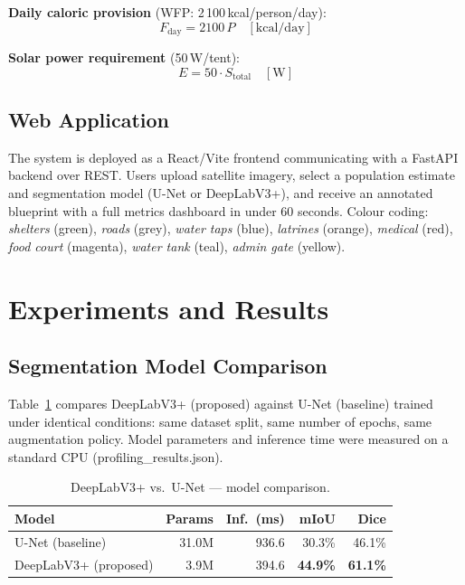 \documentclass[twocolumn]{article}
\begin{document}
\noindent\textbf{Daily caloric provision} (WFP: 2\,100\,kcal/person/day):
\begin{equation}
  F_\mathrm{day} = 2100\,P \quad [\mathrm{kcal/day}]
  \label{eq:food}
\end{equation}

\noindent\textbf{Solar power requirement} (50\,W/tent):
\begin{equation}
  E = 50\cdot S_\mathrm{total} \quad [\mathrm{W}]
  \label{eq:solar}
\end{equation}

\subsection{Web Application}

The system is deployed as a React/Vite frontend communicating with a FastAPI backend over REST.
Users upload satellite imagery, select a population estimate and segmentation model (U-Net or
DeepLabV3+), and receive an annotated blueprint with a full metrics dashboard in under 60 seconds.
Colour coding:
\textit{shelters} (green),
\textit{roads} (grey),
\textit{water taps} (blue),
\textit{latrines} (orange),
\textit{medical} (red),
\textit{food court} (magenta),
\textit{water tank} (teal),
\textit{admin gate} (yellow).

\section{Experiments and Results}
\label{sec:experiments}

\subsection{Segmentation Model Comparison}

Table~\ref{tab:model} compares DeepLabV3+ (proposed) against U-Net (baseline) trained under
identical conditions: same dataset split, same number of epochs, same augmentation policy.
Model parameters and inference time were measured on a standard CPU (profiling\_results.json).

\begin{table}[h]
  \caption{DeepLabV3+ vs.\ U-Net --- model comparison.}
  \label{tab:model}
  \centering\small
  \setlength{\tabcolsep}{3pt}
  \begin{tabular}{@{}lrrrr@{}}
    \toprule
    \textbf{Model} & \textbf{Params} & \textbf{Inf.\ (ms)} & \textbf{mIoU} & \textbf{Dice} \\
    \midrule
    U-Net (baseline)      & 31.0M & 936.6 & 30.3\% & 46.1\% \\
    DeepLabV3+ (proposed) &  3.9M & 394.6 & \textbf{44.9\%} & \textbf{61.1\%} \\
    \bottomrule
  \end{tabular}
\end{table}
\end{document}
